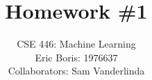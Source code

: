 \title{Homework \#1} 
\author{\normalsize{CSE 446: Machine Learning}\\ 
\normalsize{Eric Boris: 1976637}\\
\normalsize{Collaborators: Sam Vanderlinda}}
\maketitle

